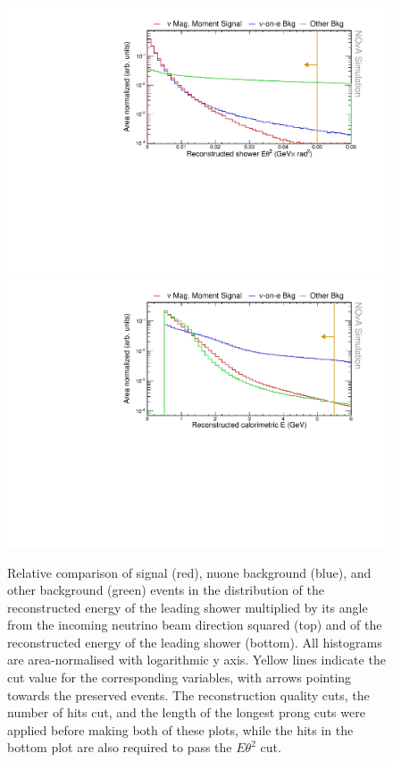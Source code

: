 \begin{figure}[hbtp]
\centering
\includegraphics[width=.9\textwidth]{Plots/NuMMEventSelection/LogY_N1Cut_eth2Loose.pdf}
\includegraphics[width=.9\textwidth]{Plots/NuMMEventSelection/LogY_N1Cut_calEHighLoose.pdf}
\caption[$E\theta^2$ and high calorimetric energy cut for basic event selection]{Relative comparison of signal (red), \acrshort{nuone} background (blue), and other background (green) events in the distribution of the reconstructed energy of the leading shower multiplied by its angle from the incoming neutrino beam direction squared (top) and of the reconstructed energy of the leading shower (bottom). All histograms are area-normalised with logarithmic y axis. Yellow lines indicate the cut value for the corresponding variables, with arrows pointing towards the preserved events. The reconstruction quality cuts, the number of hits cut, and the length of the longest prong cuts were applied before making both of these plots, while the hits in the bottom plot are also required to pass the $E\theta^2$ cut.}
\label{fig:NuMMCutsETh2CalEHighLoose}
\end{figure}

